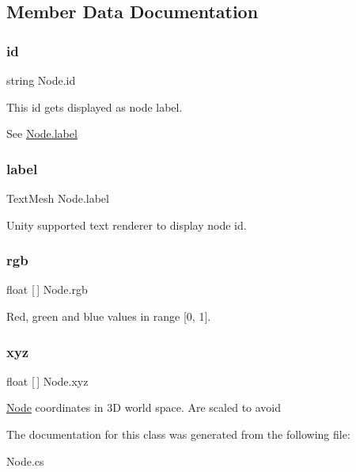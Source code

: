 \subsection{Member Data Documentation}
\mbox{\label{class_node_aac01078adae41d418df6d5e92e19093f}} 
\subsubsection{\texorpdfstring{id}{id}}
{\footnotesize\ttfamily string Node.\+id}



This id gets displayed as node label. 

See \mbox{\hyperlink{class_node_a6529bbce9a0d3a42b5738b7f338ff129}{Node.\+label}} \mbox{\label{class_node_a6529bbce9a0d3a42b5738b7f338ff129}} 
\subsubsection{\texorpdfstring{label}{label}}
{\footnotesize\ttfamily Text\+Mesh Node.\+label}



Unity supported text renderer to display node id. 

\mbox{\label{class_node_a72369fbc3dfe1c11ebef2d447454e0a6}} 
\subsubsection{\texorpdfstring{rgb}{rgb}}
{\footnotesize\ttfamily float \mbox{[}$\,$\mbox{]} Node.\+rgb}



Red, green and blue values in range \mbox{[}0, 1\mbox{]}. 

\mbox{\label{class_node_af9ab567cc411e1883e8466db9cca5bbc}} 
\subsubsection{\texorpdfstring{xyz}{xyz}}
{\footnotesize\ttfamily float \mbox{[}$\,$\mbox{]} Node.\+xyz}



\mbox{\hyperlink{class_node}{Node}} coordinates in 3D world space. Are scaled to avoid 



The documentation for this class was generated from the following file\+:\begin{DoxyCompactItemize}
\item 
Node.\+cs\end{DoxyCompactItemize}
